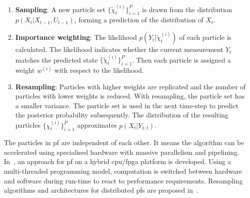 \begin{enumerate}
\item \textbf{Sampling}: A new particle set $\{\widetilde{\chi}^{(i)}_t\}^P_{i=1}$ is drawn from the distribution $p(X_t|X_{t-1},U_{t-1})$, forming a prediction of the distribution of $X_t$.
\item \textbf{Importance weighting}: The likelihood $p(Y_t|\widetilde{\chi}^{(i)}_t)$ of each particle is calculated. 
The likelihood indicates whether the current measurement $Y_t$ matches the predicted state $\{\widetilde{\chi}^{(i)}_t\}^P_{i=1}$. 
Then each particle is assigned a weight $w^{(i)}$ with respect to the likelihood.
\item \textbf{Resampling}: Particles with higher weights are replicated and the number of particles with lower weights is reduced. 
With resampling, the particle set has a smaller variance. 
The particle set is used in the next time-step to predict the posterior probability subsequently. 
The distribution of the resulting particles $\{\chi^{(i)}_t\}^P_{i=1}$ approximates $p(X_t|Y_{1:t})$.
\end{enumerate}

The particles in \gls{pf} are independent of each other.
It means the algorithm can be accelerated using specialised hardware with massive parallelism and pipelining.
In~\cite{happe11}, an approach for \gls{pf} on a hybrid \gls{cpu}/\gls{fpga} platform is developed.
Using a multi-threaded programming model, computation is switched between hardware and software during run-time to react to performance requirements. 
Resampling algorithms and architectures for distributed \gls{pf}s are proposed in~\cite{bolic05}.


